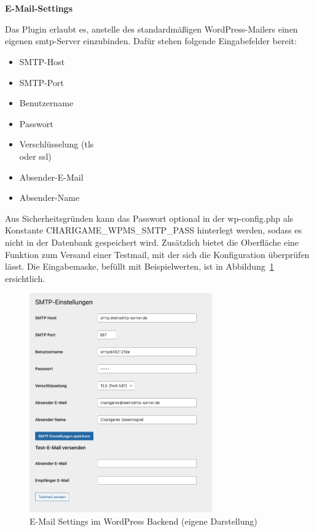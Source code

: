 \\\\
\textbf{E-Mail-Settings}

Das Plugin erlaubt es, anstelle des standardmäßigen WordPress-Mailers einen eigenen \gls{smtp}-Server einzubinden.
Dafür stehen folgende Eingabefelder bereit:
\begin{itemize}
    \item SMTP-Host
    \item SMTP-Port
    \item Benutzername
    \item Passwort
    \item Verschlüsselung (\gls{tls} \\oder \gls{ssl})
    \item Absender-E-Mail
    \item Absender-Name
\end{itemize}
Aus Sicherheitsgründen kann das Passwort optional in der wp-config.php als Konstante \glqq CHARIGAME\_WPMS\_SMTP\_PASS\grqq{} hinterlegt werden, sodass es nicht in der Datenbank gespeichert wird.
Zusätzlich bietet die Oberfläche eine Funktion zum Versand einer Testmail, mit der sich die Konfiguration überprüfen lässt. Die Eingabemaske, befüllt mit Beispielwerten, ist in Abbildung~\ref{fig:email-backend-legacy} ersichtlich.
\begin{figure}[H]
    \centering
    \includegraphics[width=0.7\textwidth]{images/legacy_email_backend}
    \caption{E-Mail Settings im WordPress Backend (eigene Darstellung)}
    \label{fig:email-backend-legacy}
\end{figure}

